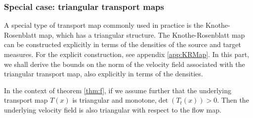 \subsubsection{Special case: triangular transport maps}
A special type of transport map commonly used in practice is the Knothe-Rosenblatt map, which has a triangular structure. The Knothe-Rosenblatt map can be constructed explicitly in terms of the densities of the source and target measures. For the explicit construction, see appendix \ref{app:KRMap}. In this part, we shall derive the bounds on the norm of the velocity field associated with the triangular transport map, also explicitly in terms of the densities. 


\begin{proposition}
In the context of theorem \ref{thm:f}, if we assume further that the underlying transport map $T(x)$ is triangular and monotone,$\det(T_t(x)) > 0$. Then the underlying velocity field is also triangular with respect to the flow map.  
\end{proposition}

